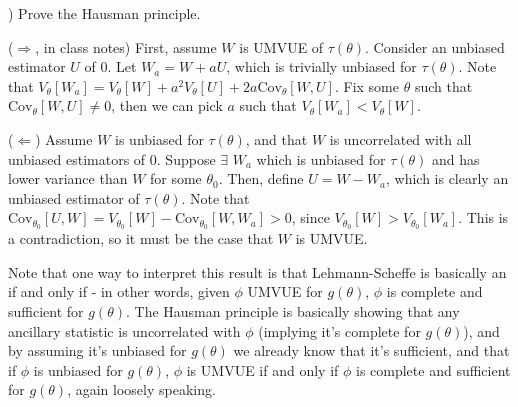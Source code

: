 \documentclass[12pt,english]{article}
\begin{document}
\vspace{1em}
) Prove the Hausman principle.
\vspace{1em}

($\Rightarrow$, in class notes) First, assume $W$ is UMVUE of $\tau(\theta)$. Consider an unbiased estimator $U$ of 0. Let $W_{a} = W + aU$, which is trivially unbiased for $\tau(\theta)$. Note that $V_{\theta}[W_{a}] = V_{\theta}[W] + a^{2} V_{\theta}[U] + 2a \text{Cov}_{\theta}[W, U]$. Fix some $\theta$ such that $\text{Cov}_{\theta}[W, U] \neq 0$, then we can pick $a$ such that $V_{\theta}[W_{a}] < V_{\theta}[W]$.

($\Leftarrow$) Assume $W$ is unbiased for $\tau(\theta)$, and that $W$ is uncorrelated with all unbiased estimators of 0. Suppose $\exists$ $W_{a}$ which is unbiased for $\tau(\theta)$ and has lower variance than $W$ for some $\theta_{0}$. Then, define $U = W - W_{a}$, which is clearly an unbiased estimator of $\tau(\theta)$. Note that $\text{Cov}_{\theta_{0}}[U, W] = V_{\theta_{0}}[W] - \text{Cov}_{\theta_{0}}[W, W_{a}] > 0$, since $V_{\theta_{0}}[W] > V_{\theta_{0}}[W_{a}]$. This is a contradiction, so it must be the case that $W$ is UMVUE.

Note that one way to interpret this result is that Lehmann-Scheffe is basically an if and only if - in other words, given $\phi$ UMVUE for $g(\theta)$, $\phi$ is complete and sufficient for $g(\theta)$. The Hausman principle is basically showing that any ancillary statistic is uncorrelated with $\phi$ (implying it's complete for $g(\theta)$), and by assuming it's unbiased for $g(\theta)$ we already know that it's sufficient, and that if $\phi$ is unbiased for $g(\theta)$, $\phi$ is UMVUE if and only if $\phi$ is complete and sufficient for $g(\theta)$, again loosely speaking.
\end{document}
